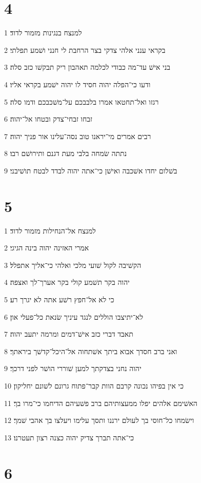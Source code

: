 \chapter{4}

\par 1 למנצח בנגינות מזמור לדוד׃
\par 2 בקראי ענני אלהי צדקי בצר הרחבת לי חנני ושׁמע תפלתי׃
\par 3 בני אישׁ עד־מה כבודי לכלמה תאהבון ריק תבקשׁו כזב סלה׃
\par 4 ודעו כי־הפלה יהוה חסיד לו יהוה ישׁמע בקראי אליו׃
\par 5 רגזו ואל־תחטאו אמרו בלבבכם על־משׁכבכם ודמו סלה׃
\par 6 זבחו זבחי־צדק ובטחו אל־יהוה׃
\par 7 רבים אמרים מי־יראנו טוב נסה־עלינו אור פניך יהוה׃
\par 8 נתתה שׂמחה בלבי מעת דגנם ותירושׁם רבו׃
\par 9 בשׁלום יחדו אשׁכבה ואישׁן כי־אתה יהוה לבדד לבטח תושׁיבני׃

\chapter{5}

\par 1 למנצח אל־הנחילות מזמור לדוד׃
\par 2 אמרי האזינה יהוה בינה הגיגי׃
\par 3 הקשׁיבה לקול שׁועי מלכי ואלהי כי־אליך אתפלל׃
\par 4 יהוה בקר תשׁמע קולי בקר אערך־לך ואצפה׃
\par 5 כי לא אל־חפץ רשׁע אתה לא יגרך רע׃
\par 6 לא־יתיצבו הוללים לנגד עיניך שׂנאת כל־פעלי און׃
\par 7 תאבד דברי כזב אישׁ־דמים ומרמה יתעב יהוה׃
\par 8 ואני ברב חסדך אבוא ביתך אשׁתחוה אל־היכל־קדשׁך ביראתך׃
\par 9 יהוה נחני בצדקתך למען שׁוררי הושׁר לפני דרכך׃
\par 10 כי אין בפיהו נכונה קרבם הוות קבר־פתוח גרונם לשׁונם יחליקון׃
\par 11 האשׁימם אלהים יפלו ממעצותיהם ברב פשׁעיהם הדיחמו כי־מרו בך׃
\par 12 וישׂמחו כל־חוסי בך לעולם ירננו ותסך עלימו ויעלצו בך אהבי שׁמך׃
\par 13 כי־אתה תברך צדיק יהוה כצנה רצון תעטרנו׃

\chapter{6}

